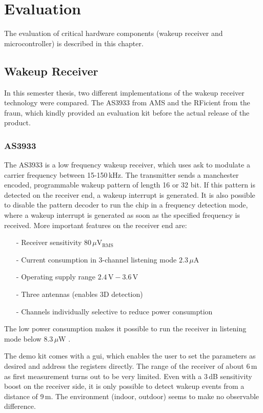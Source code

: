 \chapter{Evaluation}
The evaluation of critical hardware components (wakeup receiver and microcontroller) is described in this chapter.


\section{Wakeup Receiver}
In this semester thesis, two different implementations of the wakeup receiver technology were compared.
The AS3933 from AMS and the RFicient from the \acf{fraun}, which kindly provided an evaluation kit before the actual release of the product.

\subsection{AS3933}
The AS3933 is a low frequency wakeup receiver, which uses \acs{ask} to modulate a carrier frequency between 15-150\,kHz.
The transmitter sends a manchester encoded, programmable wakeup pattern of length 16 or 32 bit.
If this pattern is detected on the receiver end, a wakeup interrupt is generated.
It is also possible to disable the pattern decoder to run the chip in a frequency detection mode, where a wakeup interrupt is generated as soon as the specified frequency is received.
More important features on the receiver end are:
\begin{itemize}
	\item[-] Receiver sensitivity $80\,\mu\text{V$_{\text{RMS}}$}$
	\item[-] Current consumption in 3-channel listening mode $2.3\,\mu\text{A}$
	\item[-] Operating supply range $2.4\,\text{V}-3.6\,\text{V}$
	\item[-] Three antennas (enables 3D detection)
	\item[-] Channels individually selective to reduce power consumption
\end{itemize}
The low power consumption makes it possible to run the receiver in listening mode below $8.3\,\mu\text{W}$ \cite{as3933}.

The demo kit comes with a \acs{gui}, which enables the user to set the parameters as desired and address the registers directly.
The range of the receiver of about 6\,m as first measurement turns out to be very limited.
Even with a 3\,dB sensitivity boost on the receiver side, it is only possible to detect wakeup events from a distance of 9\,m.
The environment (indoor, outdoor) seems to make no observable difference.


